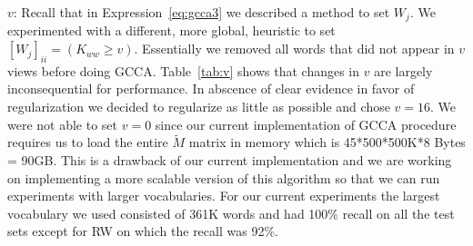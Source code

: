 \documentclass[11pt]{article}
\begin{document}
$v$: Recall that in Expression~\ref{eq:gcca3} we described a method to
  set $W_j$. We experimented with a different, more global, heuristic to
  set $[W_j]_{ii} = (K_{ww} \ge v)$. Essentially we removed all
  words that did not appear in $v$ views before doing
  GCCA. Table~\ref{tab:v} shows that changes in $v$ are largely
  inconsequential for performance. In abscence of clear evidence in favor of regularization we
  decided to regularize as little as possible and chose $v=16$. We were
  not able to set $v=0$ since our current implementation of GCCA
  procedure requires us to load the entire $\tilde{M}$ matrix in
  memory which is 45*500*500K*8 Bytes = 90GB.
  This is a drawback of our current implementation and we
  are working on implementing a more scalable version of this
  algorithm so that we can run experiments with larger
  vocabularies. For our current experiments the largest vocabulary we
  used consisted of 361K words and had 100\% recall on all the test
  sets except for RW on which the recall was 92\%.
  
\end{document}
